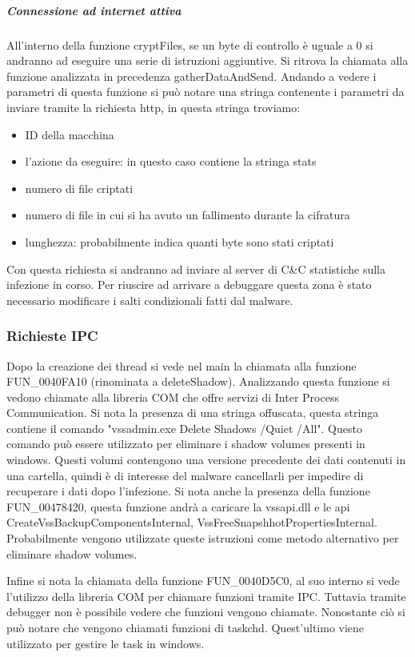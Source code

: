 \documentclass[a4paper,12pt]{article}
\begin{document}
\subparagraph{Connessione ad internet attiva}
All'interno della funzione cryptFiles, se un byte di controllo è uguale a 0 si andranno ad eseguire una serie di istruzioni aggiuntive. Si ritrova la chiamata alla funzione analizzata in precedenza gatherDataAndSend. Andando a vedere i parametri di questa funzione si può notare una stringa contenente i parametri da inviare tramite la richiesta http, in questa stringa troviamo: \begin{itemize}
	\item ID della macchina
	\item l'azione da eseguire: in questo caso contiene la stringa stats
	\item numero di file criptati
	\item numero di file in cui si ha avuto un fallimento durante la cifratura
	\item lunghezza: probabilmente indica quanti byte sono stati criptati
\end{itemize} 

Con questa richiesta si andranno ad inviare al server di C\&C statistiche sulla infezione in corso. Per riuscire ad arrivare a debuggare questa zona è stato necessario modificare i salti condizionali fatti dal malware.

\subsubsection{Richieste IPC}
Dopo la creazione dei thread si vede nel main la chiamata alla funzione FUN\_0040FA10 (rinominata a deleteShadow). Analizzando questa funzione si vedono chiamate alla libreria COM che offre servizi di Inter Process Communication.  Si nota la presenza di una stringa offuscata, questa stringa contiene il comando "vssadmin.exe Delete Shadows /Quiet /All". Questo comando può essere utilizzato per eliminare i shadow volumes presenti in windows. Questi volumi contengono una versione precedente dei dati contenuti in una cartella, quindi è di interesse del malware cancellarli per impedire di recuperare i dati dopo l'infezione. Si nota anche la presenza della funzione FUN\_00478420, questa funzione andrà a caricare la vssapi.dll e le api CreateVssBackupComponentsInternal, VssFreeSnapshhotPropertiesInternal. Probabilmente vengono utilizzate queste istruzioni come metodo alternativo per eliminare shadow volumes. 

Infine si nota la chiamata della funzione FUN\_0040D5C0, al suo interno si vede l'utilizzo della libreria COM per chiamare funzioni tramite IPC. Tuttavia tramite debugger non è possibile vedere che funzioni vengono chiamate. Nonostante ciò si può notare che vengono chiamati funzioni di taskchd. Quest'ultimo viene utilizzato per gestire le task in windows. 
  
\end{document}
